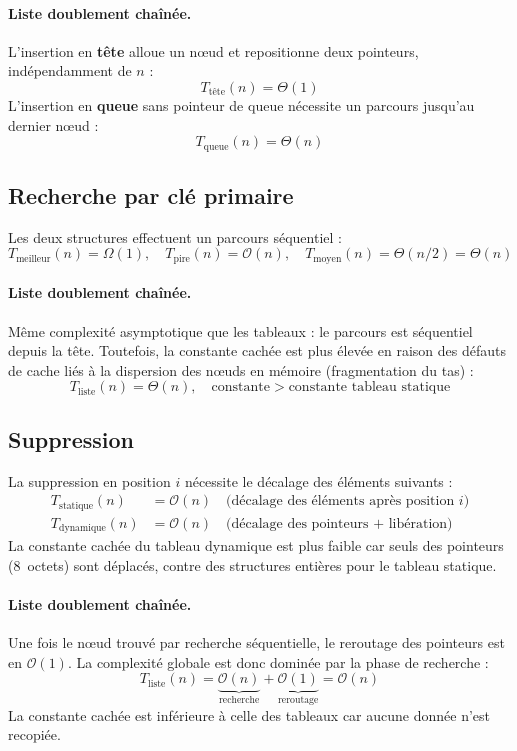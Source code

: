 \documentclass[12pt,a4paper]{report}
\begin{document}
\paragraph{Liste doublement chaînée.}
L'insertion en \textbf{tête} alloue un nœud et repositionne deux pointeurs, indépendamment de $n$ :
\[
T_{\text{tête}}(n) = \Theta(1)
\]
L'insertion en \textbf{queue} sans pointeur de queue nécessite un parcours jusqu'au dernier nœud :
\[
T_{\text{queue}}(n) = \Theta(n)
\]

\subsection{Recherche par clé primaire}

Les deux structures effectuent un parcours séquentiel :
\[
T_{\text{meilleur}}(n) = \Omega(1), \quad T_{\text{pire}}(n) = \mathcal{O}(n), \quad T_{\text{moyen}}(n) = \Theta(n/2) = \Theta(n)
\]

\paragraph{Liste doublement chaînée.}
Même complexité asymptotique que les tableaux : le parcours est séquentiel depuis la tête. Toutefois, la constante cachée est plus élevée en raison des défauts de cache liés à la dispersion des nœuds en mémoire (fragmentation du tas) :
\[
T_{\text{liste}}(n) = \Theta(n), \quad \text{constante} > \text{constante tableau statique}
\]

\subsection{Suppression}

La suppression en position $i$ nécessite le décalage des éléments suivants :
\begin{align*}
T_{\text{statique}}(n)  &= \mathcal{O}(n) \quad \text{(décalage des éléments après position } i \text{)} \\
T_{\text{dynamique}}(n) &= \mathcal{O}(n) \quad \text{(décalage des pointeurs + libération)}
\end{align*}
La constante cachée du tableau dynamique est plus faible car seuls des pointeurs (8~octets) sont déplacés, contre des structures entières pour le tableau statique.

\paragraph{Liste doublement chaînée.}
Une fois le nœud trouvé par recherche séquentielle, le reroutage des pointeurs est en $\mathcal{O}(1)$. La complexité globale est donc dominée par la phase de recherche :
\[
T_{\text{liste}}(n) = \underbrace{\mathcal{O}(n)}_{\text{recherche}} + \underbrace{\mathcal{O}(1)}_{\text{reroutage}} = \mathcal{O}(n)
\]
La constante cachée est inférieure à celle des tableaux car aucune donnée n'est recopiée.
\end{document}
